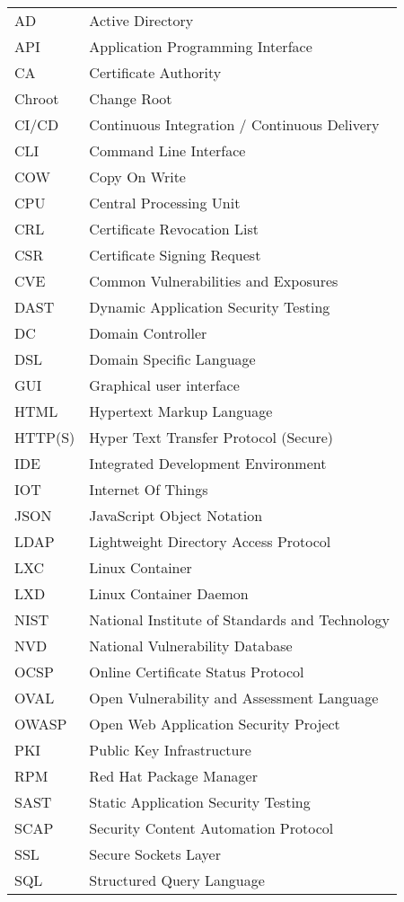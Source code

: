 \begin{longtable}{p{3cm}p{10cm}}
AD&Active Directory\\
API&Application Programming Interface\\
CA&Certificate Authority\\
Chroot&Change Root\\
CI/CD&Continuous Integration / Continuous Delivery\\
CLI&Command Line Interface\\
COW&Copy On Write\\
CPU&Central Processing Unit\\
CRL&Certificate Revocation List\\
CSR&Certificate Signing Request\\
CVE&Common Vulnerabilities and Exposures\\
DAST&Dynamic Application Security Testing\\
DC&Domain Controller\\
DSL&Domain Specific Language\\
GUI&Graphical user interface\\
HTML&Hypertext Markup Language\\
HTTP(S)&Hyper Text Transfer Protocol (Secure)\\
IDE&Integrated Development Environment\\
IOT&Internet Of Things\\
JSON&JavaScript Object Notation\\
LDAP&Lightweight Directory Access Protocol\\
LXC&Linux Container\\
LXD&Linux Container Daemon\\
NIST&National Institute of Standards and Technology\\
NVD&National Vulnerability Database\\
OCSP&Online Certificate Status Protocol\\
OVAL&Open Vulnerability and Assessment Language\\
OWASP&Open Web Application Security Project\\
PKI&Public Key Infrastructure\\
RPM&Red Hat Package Manager\\
SAST&Static Application Security Testing\\
SCAP&Security Content Automation Protocol\\
SSL&Secure Sockets Layer\\
SQL&Structured Query Language\\

\end{longtable}

